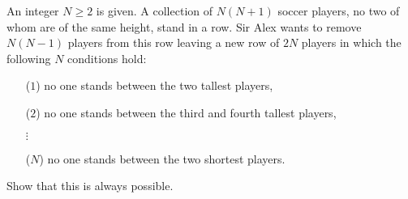 An integer $N \ge 2$ is given. A collection of $N(N + 1)$ soccer players, no two of whom are of the same height, stand in a row. Sir Alex wants to remove $N(N - 1)$ players from this row leaving a new row of $2N$ players in which the following $N$ conditions hold:

\begin{itemize}
	\item[($1$)] no one stands between the two tallest players,
	\item[($2$)] no one stands between the third and fourth tallest players,
	\item[$\vdots$]
	\item[($N$)] no one stands between the two shortest players.
\end{itemize}

Show that this is always possible.

